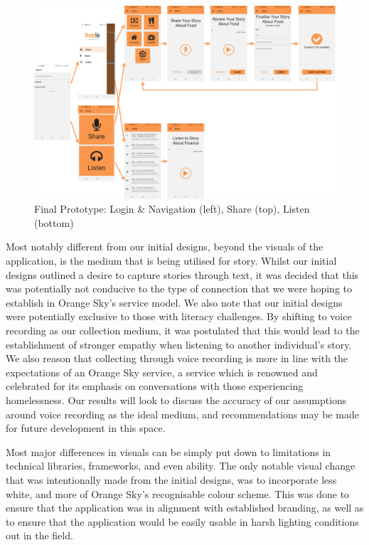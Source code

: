 \begin{figure}[ht!]
    \centering
    \includegraphics[width=\textwidth]{assets/designs/20200831-mockups.png}
    \caption{Final Prototype: Login \& Navigation (left), Share (top), Listen (bottom)}
    \label{finalprototype}
\end{figure}

\clearpage

Most notably different from our initial designs, beyond the visuals of the application, is the medium that is being utilised for story. Whilst our initial designs outlined a desire to capture stories through text, it was decided that this was potentially not conducive to the type of connection that we were hoping to establish in Orange Sky's service model. We also note that our initial designs were potentially exclusive to those with literacy challenges. By shifting to voice recording as our collection medium, it was postulated that this would lead to the establishment of stronger empathy when listening to another individual's story. We also reason that collecting through voice recording is more in line with the expectations of an Orange Sky service, a service which is renowned and celebrated for its emphasis on conversations with those experiencing homelessness. Our results will look to discuss the accuracy of our assumptions around voice recording as the ideal medium, and recommendations may be made for future development in this space.

Most major differences in visuals can be simply put down to limitations in technical libraries, frameworks, and even ability. The only notable visual change that was intentionally made from the initial designs, was to incorporate less white, and more of Orange Sky's recognisable colour scheme. This was done to ensure that the application was in alignment with established branding, as well as to ensure that the application would be easily usable in harsh lighting conditions out in the field.

